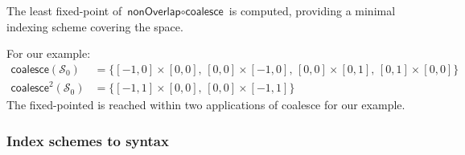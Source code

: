 The least fixed-point of $\textsf{nonOverlap} \circ \textsf{coalesce}$
is computed, providing a minimal indexing scheme covering the space.

For our example:
%
\begin{align*}
\textsf{coalesce}(\mathcal{S}_0) & =
\{[-1,0] \times [0,0],\,[0,0] \times [-1, 0],\,[0,0] \times [0,1],\,[0,1]
  \times [0,0]\} \\
\textsf{coalesce}^2(\mathcal{S}_0) & =
\{[-1, 1] \times [0, 0],\,[0, 0] \times [-1, 1]\}
\end{align*}
%
The fixed-pointed is reached within two applications of
\textsf{coalesce} for our example.

\subsubsection{Index schemes to syntax}
